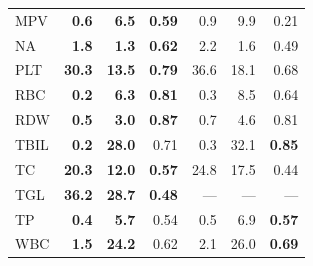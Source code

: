 \begin{table}[ht]
\begin{tabular}{lrrrrrr}
MPV & \textbf{0.6} & \textbf{6.5} & \textbf{0.59} & 0.9 & 9.9 & 0.21 \\
NA & \textbf{1.8} & \textbf{1.3} & \textbf{0.62} & 2.2 & 1.6 & 0.49 \\
PLT & \textbf{30.3} & \textbf{13.5} & \textbf{0.79} & 36.6 & 18.1 & 0.68 \\
RBC & \textbf{0.2} & \textbf{6.3} & \textbf{0.81} & 0.3 & 8.5 & 0.64 \\
RDW & \textbf{0.5} & \textbf{3.0} & \textbf{0.87} & 0.7 & 4.6 & 0.81 \\
TBIL & \textbf{0.2} & \textbf{28.0} & 0.71 & 0.3 & 32.1 & \textbf{0.85} \\
TC & \textbf{20.3} & \textbf{12.0} & \textbf{0.57} & 24.8 & 17.5 & 0.44 \\
TGL & \textbf{36.2} & \textbf{28.7} & \textbf{0.48} & --- & --- & --- \\
TP & \textbf{0.4} & \textbf{5.7} & 0.54 & 0.5 & 6.9 & \textbf{0.57} \\
WBC & \textbf{1.5} & \textbf{24.2} & 0.62 & 2.1 & 26.0 & \textbf{0.69} \\
\bottomrule
\end{tabular}
\label{tab:05_analyte_performance}
\end{table}